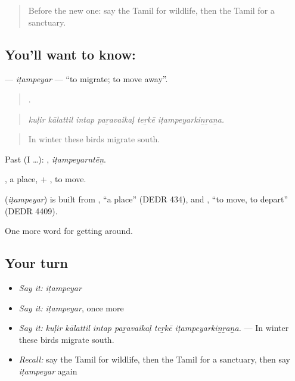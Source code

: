 \label{lesson:TA-C437-itampeyar}



\begin{quote}
Before the new one: say the Tamil for wildlife, then the Tamil for a sanctuary.
\end{quote}

\subsection*{You'll want to know: }
\textbf{} — \emph{iṭampeyar} — \textquotedblleft{}to migrate; to move away\textquotedblright{}.

\begin{quote}
     .
\end{quote}

\begin{quote}
\emph{kuḷir kālattil intap paṟavaikaḷ teṟkē iṭampeyarkiṉṟaṉa.}
\end{quote}

\begin{quote}
In winter these birds migrate south.
\end{quote}

Past (I …): , \emph{iṭampeyarntēṉ}.

, a place, + , to move.

\begin{cousinweb}
\textbf{} (\emph{iṭampeyar}) is built from , \textquotedblleft{}a place\textquotedblright{} (DEDR 434), and , \textquotedblleft{}to move, to depart\textquotedblright{} (DEDR 4409).
\end{cousinweb}

\begin{grammarlens}[title={What you've built}]
One more word for getting around.
\end{grammarlens}

\subsection*{Your turn}
\begin{itemize}
\raggedright
  \item \emph{Say it:} \emph{iṭampeyar}
  \item \emph{Say it:} \emph{iṭampeyar}, once more
  \item \emph{Say it:} \emph{kuḷir kālattil intap paṟavaikaḷ teṟkē iṭampeyarkiṉṟaṉa.} — In winter these birds migrate south.
  \item \emph{Recall:} say the Tamil for wildlife, then the Tamil for a sanctuary, then say \emph{iṭampeyar} again
\end{itemize}

